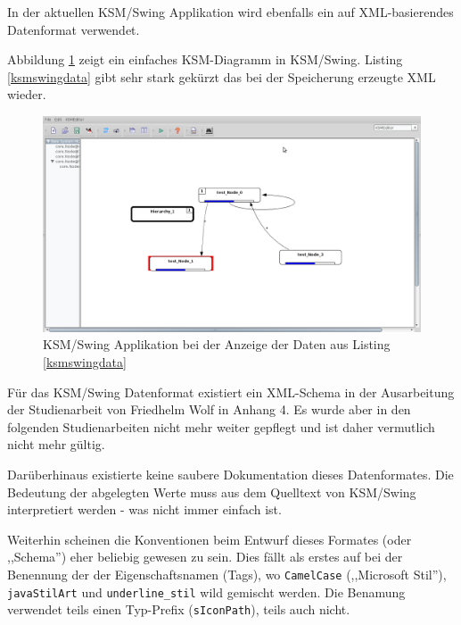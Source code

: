\documentclass[%
12pt,titlepage,abstracton,DIV=10,BCOR=0.5cm]{scrreprt}
\begin{document}
In der aktuellen KSM/Swing Applikation wird ebenfalls ein auf XML-basierendes
Datenformat verwendet.

Abbildung \ref{fig:ksmswing-diagramm} zeigt ein einfaches KSM-Diagramm in
KSM/Swing. Listing \ref{ksmswingdata} gibt sehr stark gekürzt das bei der
Speicherung erzeugte XML wieder.

\begin{figure}[ht!]
  \centering
  \includegraphics[width=\textwidth]{images/ksm-swing-screenshot.png}
  \caption{KSM/Swing Applikation bei der Anzeige der Daten aus Listing
  \ref{ksmswingdata}}
  \label{fig:ksmswing-diagramm}
\end{figure}

\label{ksmswingdata}

Für das KSM/Swing Datenformat existiert ein XML-Schema in der Ausarbeitung der
Studienarbeit von Friedhelm Wolf \cite{wolf05} in Anhang 4. Es wurde aber in den
folgenden Studienarbeiten nicht mehr weiter gepflegt und ist daher vermutlich
nicht mehr gültig.

Darüberhinaus existierte keine saubere Dokumentation dieses Datenformates. Die
Bedeutung der abgelegten Werte muss aus dem Quelltext von KSM/Swing
interpretiert werden - was nicht immer einfach ist.

Weiterhin scheinen die Konventionen beim Entwurf dieses Formates (oder
,,Schema'') eher beliebig gewesen zu sein.
Dies fällt als erstes auf bei der Benennung der der Eigenschaftsnamen (Tags), wo
\texttt{CamelCase} (,,Microsoft Stil''), \texttt{javaStilArt} und
\texttt{underline\_stil} wild gemischt werden. Die Benamung verwendet teils
einen Typ-Prefix (\texttt{sIconPath}), teils auch nicht.
\end{document}
